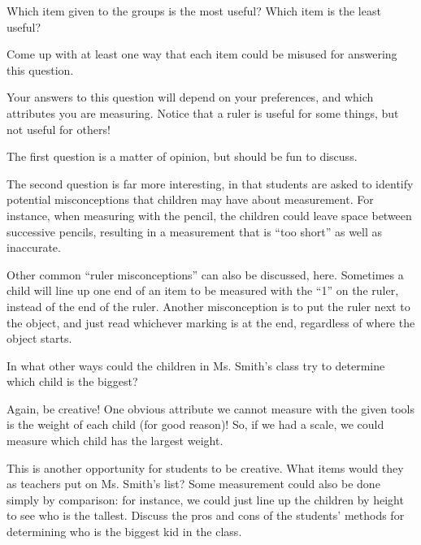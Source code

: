\documentclass[]{ximera}
\begin{document}
\begin{problem}
    Which item given to the groups is the most useful?  Which item is the least useful?
    
    Come up with at least one way that each item could be misused for answering this question.
    
    \begin{solution}
    Your answers to this question will depend on your preferences, and which attributes you are measuring.  Notice that a ruler is useful for some things, but not useful for others!
    \end{solution}
    
    \begin{instructorNotes}
        The first question is a matter of opinion, but should be fun to discuss.  
        
        The second question is far more interesting, in that students are asked to identify potential misconceptions that children may have about measurement.  For instance, when measuring with the pencil, the children could leave space between successive pencils, resulting in a measurement that is ``too short'' as well as inaccurate.  
        
        Other common ``ruler misconceptions'' can also be discussed, here.  Sometimes a child will line up one end of an item to be measured with the ``1'' on the ruler, instead of the end of the ruler.  Another misconception is to put the ruler next to the object, and just read whichever marking is at the end, regardless of where the object starts.
    \end{instructorNotes}
\end{problem}

\begin{problem}
    In what other ways could the children in Ms. Smith's class try to determine which child is the biggest?
    
    \begin{solution}
        Again, be creative!  One obvious attribute we cannot measure with the given tools is the weight of each child (for good reason)!  So, if we had a scale, we could measure which child has the largest weight.
    \end{solution}
    
    \begin{instructorNotes}
        This is another opportunity for students to be creative.  What items would they as teachers put on Ms. Smith's list?  Some measurement could also be done simply by comparison: for instance, we could just line up the children by height to see who is the tallest.  Discuss the pros and cons of the students' methods for determining who is the biggest kid in the class.
    \end{instructorNotes}
\end{problem}
\end{document}
